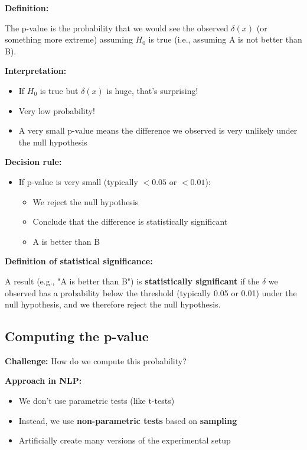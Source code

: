 \documentclass[11pt,a4paper]{article}
\theoremstyle{definition}
\theoremstyle{plain}
\theoremstyle{remark}
\begin{document}
\textbf{Definition:}

The p-value is the probability that we would see the observed $\delta(x)$ (or something more extreme) assuming $H_0$ is true (i.e., assuming A is not better than B).

\textbf{Interpretation:}

\begin{itemize}
    \item If $H_0$ is true but $\delta(x)$ is huge, that's surprising!
    \item Very low probability!
    \item A very small p-value means the difference we observed is very unlikely under the null hypothesis
\end{itemize}

\textbf{Decision rule:}

\begin{itemize}
    \item If p-value is very small (typically $< 0.05$ or $< 0.01$):
    \begin{itemize}
        \item We reject the null hypothesis
        \item Conclude that the difference is statistically significant
        \item A is better than B
    \end{itemize}
\end{itemize}

\textbf{Definition of statistical significance:}

A result (e.g., "A is better than B") is \textbf{statistically significant} if the $\delta$ we observed has a probability below the threshold (typically 0.05 or 0.01) under the null hypothesis, and we therefore reject the null hypothesis.

\subsection{Computing the p-value}

\textbf{Challenge:} How do we compute this probability?

\textbf{Approach in NLP:}

\begin{itemize}
    \item We don't use parametric tests (like t-tests)
    \item Instead, we use \textbf{non-parametric tests} based on \textbf{sampling}
    \item Artificially create many versions of the experimental setup
\end{itemize}
\end{document}
